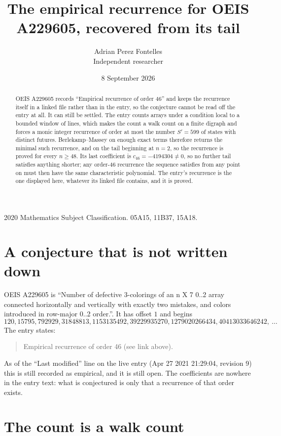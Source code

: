 \documentclass[11pt,a4paper]{article}
\title{The empirical recurrence for OEIS A229605, recovered from its tail}
\author{Adrian Perez Fontelles\\ \small Independent researcher}
\date{8 September 2026}
\theoremstyle{plain}
\theoremstyle{definition}
\begin{document}
\maketitle

\begin{abstract}
OEIS A229605 records ``Empirical recurrence of order $46$'' and keeps the recurrence itself in
a linked file rather than in the entry, so the conjecture cannot be read off the entry at all.
It can still be settled. The entry counts arrays under a condition local to a bounded window of
lines, which makes the count a walk count on a finite digraph and forces a monic integer
recurrence of order at most the number $S'=599$ of states with distinct futures. Berlekamp--Massey on
enough exact terms therefore returns the minimal such recurrence, and on the tail beginning at $n=2$, so the recurrence is proved for every $n\ge48$.
Its last coefficient is $c_{46}=-4194304\neq0$, so no further tail satisfies anything
shorter; any order-$46$ recurrence the sequence satisfies from any point on must then have
the same characteristic polynomial. The entry's recurrence is the one displayed here, whatever
its linked file contains, and it is proved.
\end{abstract}

\noindent\small 2020 Mathematics Subject Classification. 05A15, 11B37, 15A18.\normalsize

\section{A conjecture that is not written down}

OEIS A229605 is ``Number of defective 3-colorings of an n X 7 0..2 array connected horizontally and vertically with exactly two mistakes, and colors introduced in row-major 0..2 order.''. It has offset $1$ and begins
\[
120, 15795, 792929, 31848813, 1153135492, 39229935270, 1279020266434, 40413033646242,\ \dots
\]
The entry states:
\begin{quote}
Empirical recurrence of order 46 (see link above).
\end{quote}
As of the ``Last modified'' line on the live entry (Apr 27 2021 21:29:04, revision 9)
this is still recorded as empirical, and it is still open. The coefficients are nowhere in the
entry text: what is conjectured is only that a recurrence of that order exists.

\section{The count is a walk count}
\end{document}
